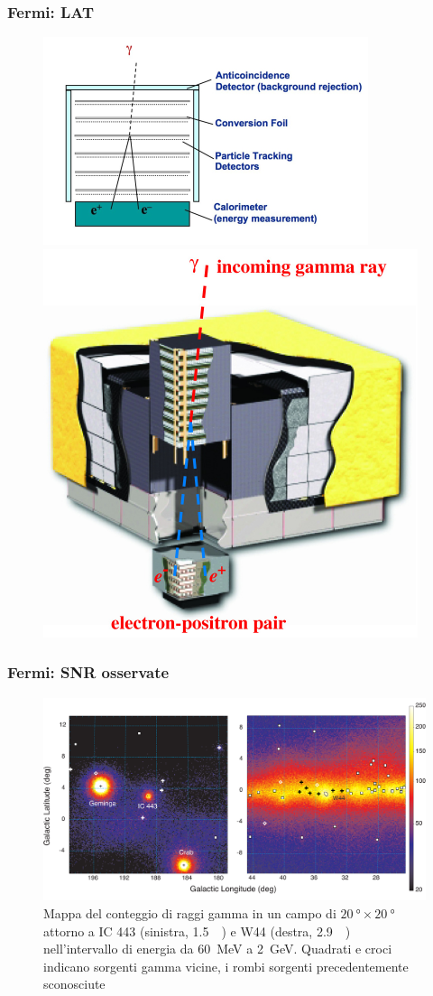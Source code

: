 \documentclass[10pt]{beamer}
\begin{document}
\begin{frame}
  \frametitle{Fermi: LAT}
  \begin{figure}
    \centering
    \includegraphics[width=0.6\columnwidth]{Gamma_telescope_schematic}
    \includegraphics[width=0.4\columnwidth]{f1}
  \end{figure}
\end{frame}

\begin{frame}
  \frametitle{Fermi: SNR osservate}
  \begin{figure}
    \centering
    \includegraphics[width=0.8\columnwidth]{1231160fig1.pdf}
    \caption{Mappa del conteggio di raggi gamma in un campo di
      $\SI{20}{\degree} \times \SI{20}{\degree}$ attorno a IC 443 (sinistra,
      \SI{1.5}{\kilo \parsec}) e W44 (destra, \SI{2.9}{\kilo \parsec})
      nell'intervallo di energia da \SI{60}{\mega\electronvolt} a
      \SI{2}{\giga\electronvolt}.  Quadrati e croci indicano sorgenti gamma
      vicine, i rombi sorgenti precedentemente sconosciute}
  \end{figure}
\end{frame}
\end{document}
